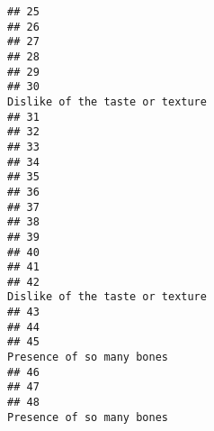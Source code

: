 \documentclass[
]{article}
\begin{document}
\begin{verbatim}
## 25                                                                                                         
## 26                                                                                                         
## 27                                                                                                         
## 28                                                                                                         
## 29                                                                                                         
## 30                                                                          Dislike of the taste or texture
## 31                                                                                                         
## 32                                                                                                         
## 33                                                                                                         
## 34                                                                                                         
## 35                                                                                                         
## 36                                                                                                         
## 37                                                                                                         
## 38                                                                                                         
## 39                                                                                                         
## 40                                                                                                         
## 41                                                                                                         
## 42                                                                          Dislike of the taste or texture
## 43                                                                                                         
## 44                                                                                                         
## 45                                                                                Presence of so many bones
## 46                                                                                                         
## 47                                                                                                         
## 48                                                                                Presence of so many bones

\end{verbatim}
\end{document}
